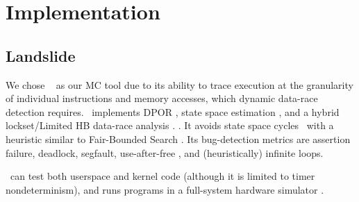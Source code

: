 \section{Implementation}
\label{sec:implementation}

\subsection{Landslide}
\label{sec:landslide}

We chose \landslide~\cite{landslide} as our MC tool due to its ability to trace execution at the granularity of individual instructions and memory accesses, which dynamic data-race detection requires.
\landslide~implements DPOR \cite{dpor},
state space estimation \cite{estimation}, and a hybrid
lockset/Limited HB
data-race analysis \cite{hybriddatarace}.
\revision{It can optionally replace DPOR with ICB \cite{chess-icb},
for which it uses Bounded Partial Order Reduction \cite{bpor} for a similar reduction,
though \quicksand~does not employ this feature (\sect{\ref{sec:future}})}.
It avoids state space cycles
~with
a heuristic similar to Fair-Bounded Search \cite{bpor}.
Its bug-detection metrics are assertion failure, deadlock, segfault, use-after-free \cite{valgrind}, and (heuristically) infinite loops.

\revision{\landslide}~can test both userspace and kernel code (although it is limited to timer nondeterminism),
and runs programs in a full-system hardware simulator \cite{simics}.

